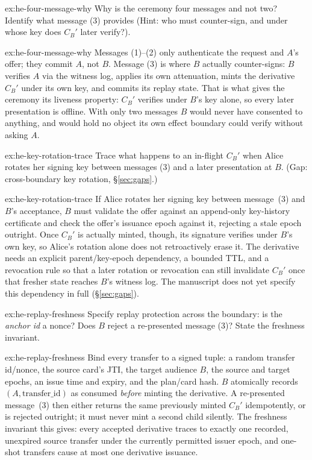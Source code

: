 \documentclass[11pt,a4paper]{article}
\theoremstyle{definition}
\theoremstyle{definition}
\theoremstyle{remark}
\begin{document}
\begin{pdexercise}[kind=Check,rating=1]{ex:he-four-message-why}
Why is the ceremony four messages and not two? Identify what message (3)
  provides (Hint: who must counter-sign, and under whose key does $C_B'$ later verify?).
\end{pdexercise}
\begin{pdsolution}{ex:he-four-message-why}
Messages (1)--(2) only authenticate the request and $A$'s offer; they commit
$A$, not $B$. Message (3) is where $B$ actually counter-signs: $B$ verifies $A$
via the witness log, applies its own attenuation, mints the derivative $C_B'$
under its own key, and commits its replay state. That is what gives the ceremony
its liveness property: $C_B'$ verifies under $B$'s key alone, so every later
presentation is offline. With only two messages $B$ would never have consented
to anything, and would hold no object its own effect boundary could verify
without asking $A$.
\end{pdsolution}
\begin{pdexercise}[kind=Trace,rating=2]{ex:he-key-rotation-trace}
Trace what happens to an in-flight $C_B'$ when Alice rotates her signing key
  between messages (3) and a later presentation at $B$. (Gap: cross-boundary key
  rotation, \S\ref{sec:gaps}.)
\end{pdexercise}
\begin{pdsolution}{ex:he-key-rotation-trace}
If Alice rotates her signing key between message~(3) and $B$'s acceptance,
$B$ must validate the offer against an append-only key-history certificate and
check the offer's issuance epoch against it, rejecting a stale epoch outright.
Once $C_B'$ is actually minted, though, its signature verifies under $B$'s own
key, so Alice's rotation alone does not retroactively erase it. The
derivative needs an explicit parent/key-epoch dependency, a bounded TTL, and a
revocation rule so that a later rotation or revocation can still invalidate
$C_B'$ once that fresher state reaches $B$'s witness log. The manuscript does not
yet specify this dependency in full (\S\ref{sec:gaps}).
\end{pdsolution}
\begin{pdexercise}[kind=Open,rating=3]{ex:he-replay-freshness}
Specify replay protection across the boundary: is the
  \textit{anchor id} a nonce? Does $B$ reject a re-presented message (3)? State the
  freshness invariant.
\end{pdexercise}
\begin{pdsolution}{ex:he-replay-freshness}
Bind every transfer to a signed tuple: a random transfer id/nonce, the
source card's JTI, the target audience $B$, the source and target epochs, an
issue time and expiry, and the plan/card hash. $B$ atomically records
$(A,\text{transfer\_id})$ as consumed \emph{before} minting the derivative. A
re-presented message~(3) then either returns the same previously minted $C_B'$
idempotently, or is rejected outright; it must never mint a second child
silently. The freshness invariant this gives: every accepted derivative traces to
exactly one recorded, unexpired source transfer under the currently permitted
issuer epoch, and one-shot transfers cause at most one derivative issuance.
\end{pdsolution}
\end{document}
